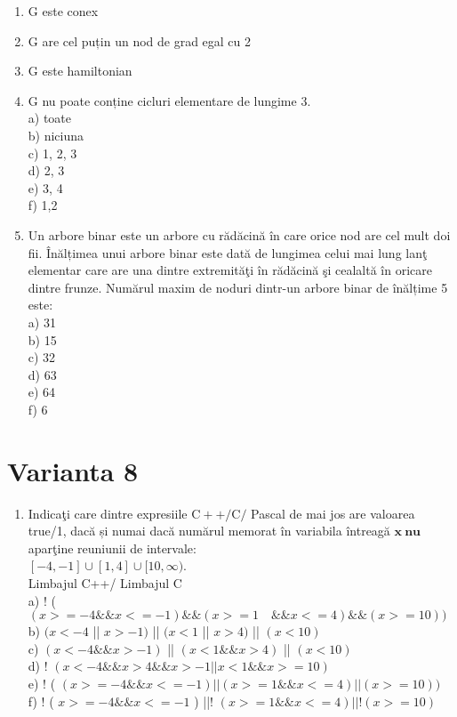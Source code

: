 \begin{enumerate}
  \item G este conex
  \item G are cel puțin un nod de grad egal cu 2
  \item G este hamiltonian
  \item G nu poate conține cicluri elementare de lungime 3.\\
a) toate\\
b) niciuna\\
c) 1, 2, 3\\
d) 2, 3\\
e) 3, 4\\
f) 1,2
  \item Un arbore binar este un arbore cu rădăcină în care orice nod are cel mult doi fii. Înălțimea unui arbore binar este dată de lungimea celui mai lung lanţ elementar care are una dintre extremităţi în rădăcină şi cealaltă în oricare dintre frunze. Numărul maxim de noduri dintr-un arbore binar de înălțime 5 este:\\
a) 31\\
b) 15\\
c) 32\\
d) 63\\
e) 64\\
f) 6
\end{enumerate}

\section*{Varianta 8}
\begin{enumerate}
  \item Indicaţi care dintre expresiile $\mathrm{C}++/ \mathrm{C} /$ Pascal de mai jos are valoarea true/1, dacă și numai dacă numărul memorat în variabila întreagă $\mathbf{x ~ n u}$ aparţine reuniunii de intervale:\\
$[-4,-1] \cup[1,4] \cup[10, \infty)$.\\
Limbajul C++/ Limbajul C\\
a) ! ( $(x>=-4 \& \& x<=-1) \& \&(x>=1 \quad \& \& x<=4) \& \&(x>=10))$\\
b) $(x<-4$ || $x>-1)$ || $(x<1$ || $x>4)$ || $(x<10)$\\
c) $(x<-4 \& \& x>-1)$ || $(x<1 \& \& x>4)$ || $(x<10)$\\
d) ! $(x<-4 \& \& x>4 \& \& x>-1| | x<1 \& \& x>=10)$\\
e) ! ( $(x>=-4 \& \& x<=-1)||(x>=1 \& \& x<=4)||(x>=10))$\\
f) ! ( $x>=-4 \& \& x<=-1$ ) ||! $(x>=1 \& \& x<=4)|\mid!(x>=10)$
\end{enumerate}

